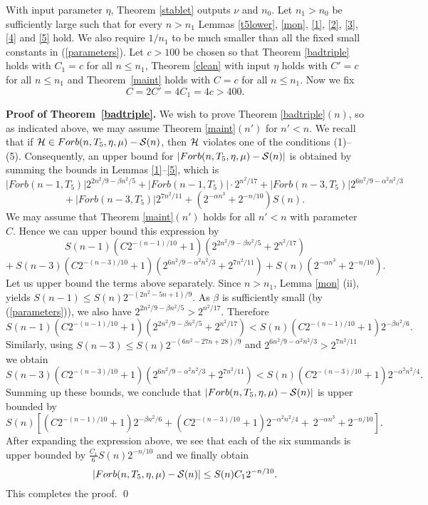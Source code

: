 \documentclass[11pt]{article}
\begin{document}
 With input parameter $\eta$, Theorem \ref{stablet} outputs $\nu$ and $n_0$.
Let  $n_1>n_0$ be sufficiently large such that for every $n>n_1$
Lemmas \ref{t5lower}, \ref{mon}, \ref{1}, \ref{2}, \ref{3}, \ref{4}
and \ref{5} hold. We also require $1/n_1$ to be much smaller than
all the fixed small constants in (\ref{parameters}). Let $c>100$ be
chosen so that Theorem \ref{badtriple} holds with $C_1=c$ for all $n
\le n_1$,  Theorem \ref{clean} with input $\eta$ holds with $C'=c$
for all $n\le n_1$ and Theorem~\ref{maint} holds with $C=c$ for all
$n \le n_1$. Now we fix
 $$C= 2C'= 4C_1=4c>400.$$


{\bf Proof of Theorem~\ref{badtriple}.}
We wish to prove Theorem \ref{badtriple}$(n)$, so as indicated above, we may assume Theorem \ref{maint}$(n')$ for $n'<n$.
We recall that if $\HH \in Forb(n, T_5, \eta, \mu) -  \S(n)$, then $\HH$ violates one of the conditions (1)--(5). Consequently, an upper bound for $|Forb(n, T_5, \eta, \mu) -  \S(n)|$ is obtained by summing the bounds in Lemmas \ref{1}--\ref{5}, which is
$$|Forb(n-1,T_5)|2^{2n^2/9 - \beta n^2/5}+ |Forb(n-1,T_5)|\cdot
2^{n^2/17} +
|Forb(n-3,T_5)|2^{6n^2/9-\alpha^2n^2/3}$$
$$ + \ |Forb(n-3,T_5)| 2^{7n^2/11} + (2^{-\alpha n^3} +
2^{-n/10})S(n).$$
We may assume that Theorem \ref{maint}$(n')$ holds for all $n'<n$ with parameter $C$.  Hence  we can upper bound this expression by
$$S(n-1)(C 2^{-(n-1)/10}+1)(2^{2n^2/9 - \beta
n^2/5}+2^{n^2/17})$$ $$+\  S(n-3)(C
2^{-(n-3)/10}+1)(2^{6n^2/9-\alpha^2n^2/3}+2^{7n^2/11}) +
S(n)(2^{-\alpha
n^3} + 2^{-n/10}).$$
Let us upper bound the terms above separately.
Since $n>n_1$, Lemma \ref{mon} (ii), yields $S(n-1) \le S(n) 2^{-(2n^2-5n+1)/9}$.
 As $\beta$ is sufficiently small (by (\ref{parameters})), we also have $ 2^{2n^2/9 - \beta n^2/5}>2^{n^2/17}$. Therefore
$$S(n-1)(C 2^{-(n-1)/10}+1)(2^{2n^2/9 - \beta
n^2/5}+2^{n^2/17})<S(n)(C 2^{-(n-1)/10}+1)2^{-\beta n^2/6}.$$
Similarly, using  $S(n-3) \le S(n) 2^{-(6n^2-27n+28)/9}$ and
$2^{6n^2/9-\alpha^2n^2/3}> 2^{7n^2/11}$ we obtain
$$S(n-3)(C
2^{-(n-3)/10}+1)(2^{6n^2/9-\alpha^2n^2/3}+2^{7n^2/11})<
S(n)(C 2^{-(n-3)/10}+1)2^{-\alpha^2n^2/4}.$$
 Summing up these bounds, we conclude that $|Forb(n, T_5, \eta, \mu) -  \S(n)|$ is upper bounded by
$$S(n)[(C 2^{-(n-1)/10}+1)2^{-\beta n^2/6} +
(C 2^{-(n-3)/10}+1)2^{-\alpha^2n^2/4}
 + \ 2^{-\alpha n^3}+ 2^{-n/10}].$$
After expanding the expression above, we see that each of the six
summands  is upper bounded by $\frac{C_1}{6}S(n)2^{-n/10}$ and we
finally obtain
 $$|Forb(n, T_5, \eta, \mu) -  \S(n)| \le S(n)C_1
2^{-n/10}.$$
This completes the proof. \qed
 \medskip
\end{document}
